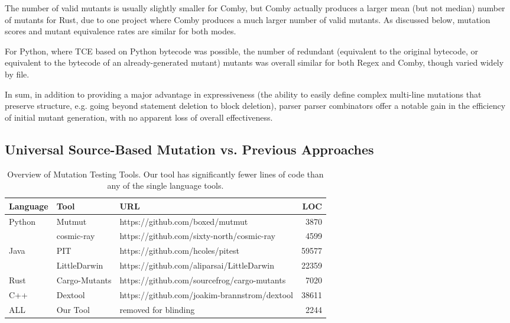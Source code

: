 \documentclass[sigconf,review, anonymous]{acmart}
\begin{document}
{The number of valid mutants is usually
slightly smaller for Comby, but Comby actually produces a larger mean
(but not median) number of mutants for Rust, due to one project where
Comby produces a much larger number of valid mutants.  As discussed 
below, mutation scores and mutant equivalence rates are similar for
both modes.

For Python, where TCE based on Python bytecode was possible, the
number of redundant (equivalent to the original bytecode, or
equivalent to the bytecode of an already-generated mutant) mutants was
overall similar for both Regex and Comby, though varied widely by file.

In sum, in addition to providing a major advantage in expressiveness
(the ability to easily define complex multi-line mutations that
preserve structure, e.g. going beyond statement deletion to block
deletion), parser parser combinators offer a notable gain in the
efficiency of initial mutant generation, with no apparent loss of overall effectiveness.

\subsection{Universal Source-Based Mutation vs. Previous Approaches}

\begin{table*}[hbtp]
    \centering
    \caption{Overview of Mutation Testing Tools. Our tool has significantly fewer lines of code than any of the single language tools.}
    \label{tab:mutationtools}
    
    \begin{tabular}{|l|l|l|r|}
    \hline
    \textbf{Language} & \textbf{Tool} & \textbf{URL} & \textbf{LOC}  \\
    \hline
    \multirow{2}{*}{Python}  & Mutmut & https://github.com/boxed/mutmut & 3870  \\\cline{2-4}
        & cosmic-ray & https://github.com/sixty-north/cosmic-ray & 4599 \\ \hline
    \multirow{2}{*}{Java}  & PIT & https://github.com/hcoles/pitest & 59577  \\\cline{2-4}
        & LittleDarwin & https://github.com/aliparsai/LittleDarwin & 22359 \\ \hline
        Rust & Cargo-Mutants & https://github.com/sourcefrog/cargo-mutants & 7020 \\\hline
        C++ & Dextool & https://github.com/joakim-brannstrom/dextool & 38611 \\\hline
        ALL & Our Tool & removed for blinding & 2244 \\\hline
    \end{tabular}
    \end{table*}
    
}
\end{document}
